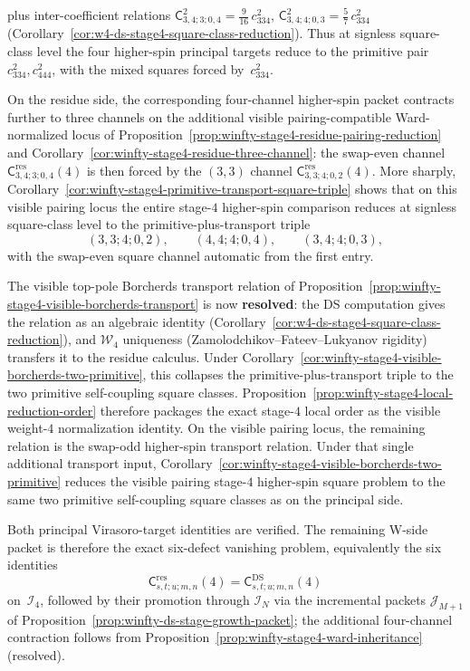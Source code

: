 \begin{remark}
plus inter-coefficient relations
$\mathsf{C}_{3,4;3;0,4}^2 = \tfrac{9}{16}\,c_{334}^2$,
$\mathsf{C}_{3,4;4;0,3}^2 = \tfrac{5}{7}\,c_{334}^2$
\textup{(}Corollary~\ref{cor:w4-ds-stage4-square-class-reduction}\textup{)}.
Thus at signless square-class level the four higher-spin principal
targets reduce to the primitive pair
$c_{334}^2,c_{444}^2$, with the mixed squares forced by~$c_{334}^2$.

On the residue side, the corresponding four-channel higher-spin packet
contracts further to three channels on the additional visible
pairing-compatible Ward-normalized locus of
Proposition~\ref{prop:winfty-stage4-residue-pairing-reduction} and
Corollary~\ref{cor:winfty-stage4-residue-three-channel}: the swap-even
channel $\mathsf{C}^{\mathrm{res}}_{3,4;3;0,4}(4)$ is then forced by
the $(3,3)$ channel
$\mathsf{C}^{\mathrm{res}}_{3,3;4;0,2}(4)$. More sharply,
Corollary~\ref{cor:winfty-stage4-primitive-transport-square-triple}
shows that on this visible pairing locus the entire stage-$4$
higher-spin comparison reduces at signless square-class level to the
primitive-plus-transport triple
\[
(3,3;4;0,2),\qquad (4,4;4;0,4),\qquad (3,4;4;0,3),
\]
with the swap-even square channel automatic from the first entry.

The visible top-pole Borcherds transport relation of
Proposition~\ref{prop:winfty-stage4-visible-borcherds-transport} is now
\textbf{resolved}: the DS computation gives the relation as an algebraic
identity (Corollary~\ref{cor:w4-ds-stage4-square-class-reduction}),
and $\mathcal{W}_4$ uniqueness (Zamolodchikov--Fateev--Lukyanov
rigidity) transfers it to the residue calculus. Under
Corollary~\ref{cor:winfty-stage4-visible-borcherds-two-primitive},
this collapses the
primitive-plus-transport triple to the two primitive self-coupling
square classes. Proposition~\ref{prop:winfty-stage4-local-reduction-order}
therefore packages the exact stage-$4$ local order as the
visible weight-$4$ normalization identity. On the visible pairing
locus, the remaining relation is the swap-odd higher-spin transport relation. Under that single additional
transport input,
Corollary~\ref{cor:winfty-stage4-visible-borcherds-two-primitive}
reduces the visible pairing stage-$4$ higher-spin square problem to
the same two primitive self-coupling square classes as on the
principal side.

Both principal Virasoro-target identities are verified.
The remaining W-side packet is therefore the exact six-defect vanishing
problem, equivalently the six identities
\[
\mathsf{C}^{\mathrm{res}}_{s,t;u;m,n}(4)
=
\mathsf{C}^{\mathrm{DS}}_{s,t;u;m,n}(4)
\]
on~$\mathcal{I}_4$, followed by their promotion through
$\mathcal{I}_N$ via the incremental packets
$\mathcal{J}_{M+1}$ of
Proposition~\ref{prop:winfty-ds-stage-growth-packet}; the additional
four-channel contraction follows from
Proposition~\ref{prop:winfty-stage4-ward-inheritance} (resolved).


\end{remark}
